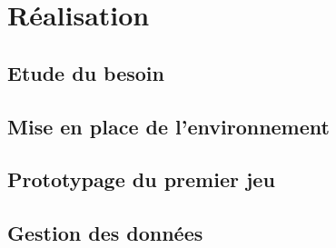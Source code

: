\section{Réalisation}

\subsection{Etude du besoin}

\subsection{Mise en place de l'environnement}

\subsection{Prototypage du premier jeu}

\subsection{Gestion des données}

\newpage